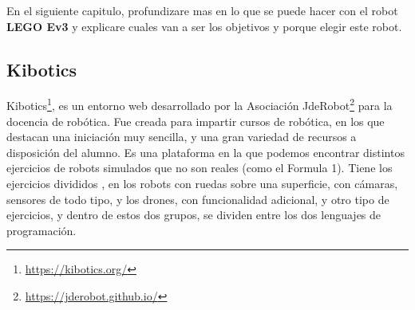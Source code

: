 En el siguiente capitulo, profundizare mas en lo que se puede hacer con el robot \textbf{LEGO Ev3} y explicare cuales van a ser los objetivos y porque elegir este robot.



\subsection{Kibotics}
\label{sec:kibotics}
Kibotics\footnote{\url{https://kibotics.org/}}, es un entorno web desarrollado por la Asociación JdeRobot\footnote{\url{https://jderobot.github.io/}} para la docencia de robótica. Fue creada para impartir cursos de robótica, en los que destacan una iniciación muy sencilla, y una gran variedad de recursos a disposición del alumno.
Es una plataforma en la que podemos encontrar distintos ejercicios de robots simulados que no son reales (como el Formula 1). Tiene los ejercicios divididos , en los robots con ruedas sobre una superficie, con cámaras, sensores de todo tipo, y los drones, con funcionalidad adicional, y otro tipo de ejercicios, y dentro de estos dos grupos, se dividen entre los dos lenguajes de programación. \newline
 
